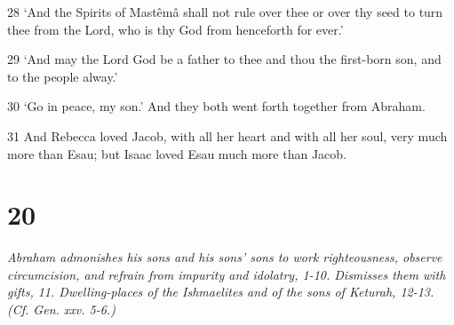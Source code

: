 \par 28 ‘And the Spirits of Mastêmâ shall not rule over thee or over thy seed to turn thee from the Lord, who is thy God from henceforth for ever.’
\par 29 ‘And may the Lord God be a father to thee and thou the first-born son, and to the people alway.’
\par 30 ‘Go in peace, my son.’ And they both went forth together from Abraham.
\par 31 And Rebecca loved Jacob, with all her heart and with all her soul, very much more than Esau; but Isaac loved Esau much more than Jacob.

\chapter{20}

\par \textit{Abraham admonishes his sons and his sons' sons to work righteousness, observe circumcision, and refrain from impurity and idolatry, 1-10. Dismisses them with gifts, 11. Dwelling-places of the Ishmaelites and of the sons of Keturah, 12-13. (Cf. Gen. xxv. 5-6.)}

